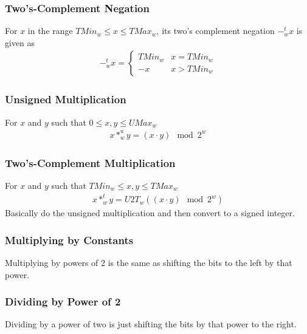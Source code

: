 \documentclass[10pt]{armath}
\begin{document}
\subsubsection{Two's-Complement Negation}%
\label{ssub:two_s_complement_negation}

For $x$ in the range $TMin_w\leq x\leq TMax_w$, its two's complement negation
$-_w^tx$ is given as
\begin{align*}
  -_w^tx=\begin{cases}
    TMin_w & x=TMin_w\\
    -x & x>TMin_w
  \end{cases}
\end{align*}

\subsubsection{Unsigned Multiplication}%
\label{ssub:unsigned_multiplication}

For $x$ and $y$ such that $0\leq x,y\leq UMax_w$
\begin{align*}
  x *_w^uy=(x\cdot y)\mod 2^w
\end{align*}

\subsubsection{Two's-Complement Multiplication}%
\label{ssub:two_s_complement_multiplication}

For $x$ and $y$ such that $TMin_w\leq x,y \leq TMax_w$
\begin{align*}
  x*_w^ty=U2T_w((x\cdot y)\mod 2^w)
\end{align*}
Basically do the unsigned multiplication and then convert to a signed integer.

\subsubsection{Multiplying by Constants}%
\label{ssub:multiplying_by_constants}

Multiplying by powers of $2$ is the same as shifting the bits to the left by
that power.

\subsubsection{Dividing by Power of 2}%
\label{ssub:dividing_by_power_of_2}

Dividing by a power of two is just shifting the bits by that power to the
right.
\end{document}
